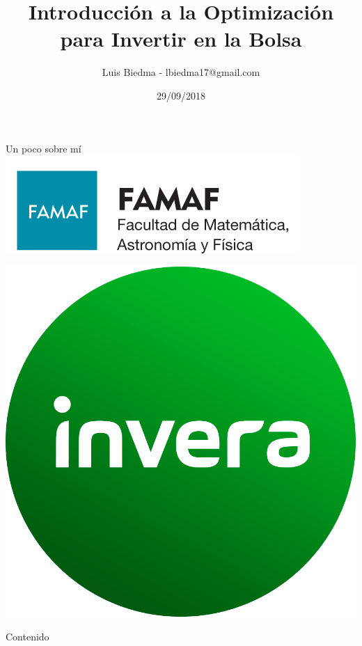 \documentclass[12pt,aspectratio=169]{beamer}
\title{Introducción a la Optimización para Invertir en la Bolsa}
\author{Luis Biedma - lbiedma17@gmail.com}
\date{29/09/2018}
\begin{document}
\maketitle

\begin{frame}{Un poco sobre mí}
	\centering
\includegraphics[width = .5\paperwidth]{famaf.png}

\includegraphics[width = .2\paperwidth]{invera.png}
\end{frame}

\begin{frame}{Contenido}
	\tableofcontents
\end{frame}
\end{document}
